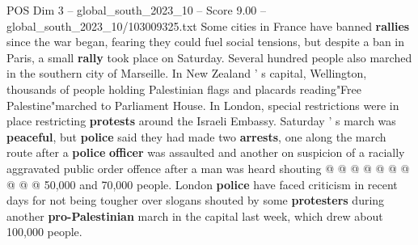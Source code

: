 \begin{textsample}{POS Dim 3 – global\_south\_2023\_10 – Score 9.00 – global\_south\_2023\_10/103009325.txt}
Some cities in France have banned \textbf{rallies} since the war began, fearing they could fuel social tensions, but despite a ban in Paris, a small \textbf{rally} took place on Saturday.
Several hundred people also marched in the southern city of Marseille.
In New Zealand ' s capital, Wellington, thousands of people holding Palestinian flags and placards reading"Free Palestine"marched to Parliament House.
In London, special restrictions were in place restricting \textbf{protests} around the Israeli Embassy.
Saturday ' s march was \textbf{peaceful}, but \textbf{police} said they had made two \textbf{arrests}, one along the march route after a \textbf{police} \textbf{officer} was assaulted and another on suspicion of a racially aggravated public order offence after a man was heard shouting @ @ @ @ @ @ @ @ @ @ 50,000 and 70,000 people.
London \textbf{police} have faced criticism in recent days for not being tougher over slogans shouted by some \textbf{protesters} during another \textbf{pro-Palestinian} march in the capital last week, which drew about 100,000 people.

\end{textsample}
